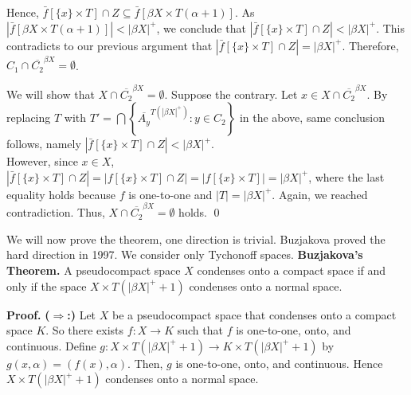 \documentclass{article}
\begin{document}
																																				  Hence, $\bar{f}\left[\{x\}\times T\right] \cap Z \subseteq \bar{f}\left[\beta X \times T(\alpha +1) \right].$ 
																																				  As $\left| \bar{f}\left[\beta X \times T(\alpha +1) \right] \right| < |\beta X |^+$, we conclude that 
																																				  $\left|\bar{f}\left[\{x\} \times T \right] \cap Z \right| < \left|\beta X \right|^+$. This contradicts to our 
																																				  previous argument that $ \left|\bar{f}\left[\{x\} \times T \right] \cap Z \right| = \left|\beta X \right|^+$. Therefore, 
																																				  $C_1\cap \overline{C_2}^{\beta X}=\emptyset$. 


																																				  \vskip 10pt

																																				  We will show that $X\cap \overline{C_2}^{\beta X}=\emptyset$. Suppose the contrary. Let $x\in X \cap \overline{C_2}^{\beta X}$. By replacing $T$ with $T'=\bigcap \left\{ \overline{A_y}^{T(|\beta X|^+)} : y\in C_2 \right\}$ in the above, same conclusion follows, namely  $\left|\bar{f}\left[\{x\} \times T \right] \cap Z \right| < \left|\beta X \right|^+$. \\

																																				  However, since $x\in X$, $\left|\bar{f}\left[\{x\} \times T \right] \cap Z \right| =\left| f\left[\{x\} \times T \right]\cap Z \right| = \left| f\left[\{x\} \times T\right]\right|= \left|\beta X \right|^+$, where the last equality holds because $f$ is one-to-one and $|T|=|\beta X|^+$. 
																																				  Again, we reached contradiction. Thus, $X\cap \overline{C_2}^{\beta X}=\emptyset$ holds. \qed



																																				  \vskip 40pt


																																				  We will now prove the theorem, one direction is trivial. Buzjakova proved the hard direction in 1997. We consider only Tychonoff spaces. 
																																				  \vskip 20pt
																																				  \textbf{Buzjakova's Theorem.} A pseudocompact space $X$ condenses onto a compact space if and only if the space $X\times T(\left| \beta X \right| ^+ +1)$ condenses onto a normal space. 
																																				  \vskip 15pt

																																				  \textbf{Proof.}\vskip 10pt
																																				  \textbf{($\Rightarrow$:) } Let $X$ be a pseudocompact space that condenses onto a compact space $K$. So there exists $f:X\rightarrow K$ such that $f$ is one-to-one, onto, and continuous. Define $g: X\times T(|\beta X|^+ +1) \rightarrow K\times T(|\beta X|^+ +1)$ by $g(x,\alpha)=(f(x), \alpha).$ Then, $g$ is one-to-one, onto, and continuous. Hence $X\times T(|\beta X|^+ +1)$ condenses onto a normal space. 
\end{document}
